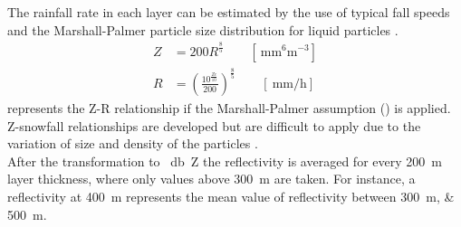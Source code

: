The rainfall rate in each layer can be estimated by the use of typical fall speeds and the Marshall-Palmer particle size distribution for liquid particles \citep{rinehart_radar_2010}. 
\begin{align}
Z & = 200 R^{\frac{8}{5}} \qquad [\SI{}{\mm^6\metre^{-3}} ] \nonumber \\ 
R & = \left( \frac{ 10^{\frac{Ze}{10}} }{200} \right)^{\frac{8}{5}} \qquad [ \SI{}{\mm\per\hour} ]
\label{eq:Z-R}
\end{align}
% 
{} represents the Z-R relationship if the Marshall-Palmer assumption () is applied. Z-snowfall relationships are developed but are difficult to apply due to the variation of size and density of the particles \citep{lecuyer_aos_2017}. \\
After the transformation to \SI{}{\decibel Z} the reflectivity is averaged for every \SI{200}{\metre} layer thickness, where only values above \SI{300}{\metre} are taken. %
For instance, a reflectivity at \SI{400}{\metre} represents the mean value of reflectivity between \SIlist{300;500}{\metre}. 

